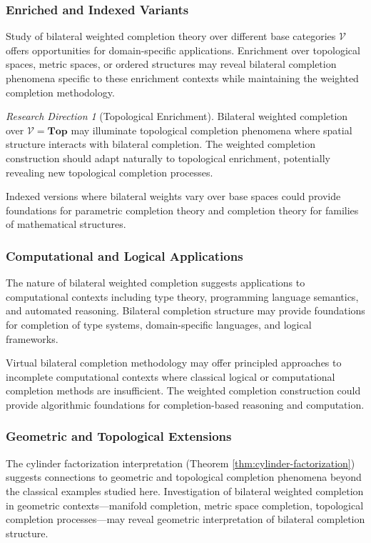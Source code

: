 \documentclass[11pt]{article}
\theoremstyle{plain}
\theoremstyle{definition}
\theoremstyle{remark}
\newtheorem{research_direction}[theorem]{Research Direction}
\newcommand{\V}{\mathcal{V}}
\begin{document}
\subsubsection{Enriched and Indexed Variants}

Study of bilateral weighted completion theory over different base categories $\V$ offers opportunities for domain-specific applications. Enrichment over topological spaces, metric spaces, or ordered structures may reveal bilateral completion phenomena specific to these enrichment contexts while maintaining the weighted completion methodology.

\begin{research_direction}[Topological Enrichment]
Bilateral weighted completion over $\V = \mathbf{Top}$ may illuminate topological completion phenomena where spatial structure interacts with bilateral completion. The weighted completion construction should adapt naturally to topological enrichment, potentially revealing new topological completion processes.
\end{research_direction}

Indexed versions where bilateral weights vary over base spaces could provide foundations for parametric completion theory and completion theory for families of mathematical structures.

\subsubsection{Computational and Logical Applications}

The nature of bilateral weighted completion suggests applications to computational contexts including type theory, programming language semantics, and automated reasoning. Bilateral completion structure may provide foundations for completion of type systems, domain-specific languages, and logical frameworks.

Virtual bilateral completion methodology may offer principled approaches to incomplete computational contexts where classical logical or computational completion methods are insufficient. The weighted completion construction could provide algorithmic foundations for completion-based reasoning and computation.

\subsubsection{Geometric and Topological Extensions}

The cylinder factorization interpretation (Theorem \ref{thm:cylinder-factorization}) suggests connections to geometric and topological completion phenomena beyond the classical examples studied here. Investigation of bilateral weighted completion in geometric contexts---manifold completion, metric space completion, topological completion processes---may reveal geometric interpretation of bilateral completion structure.
\end{document}
